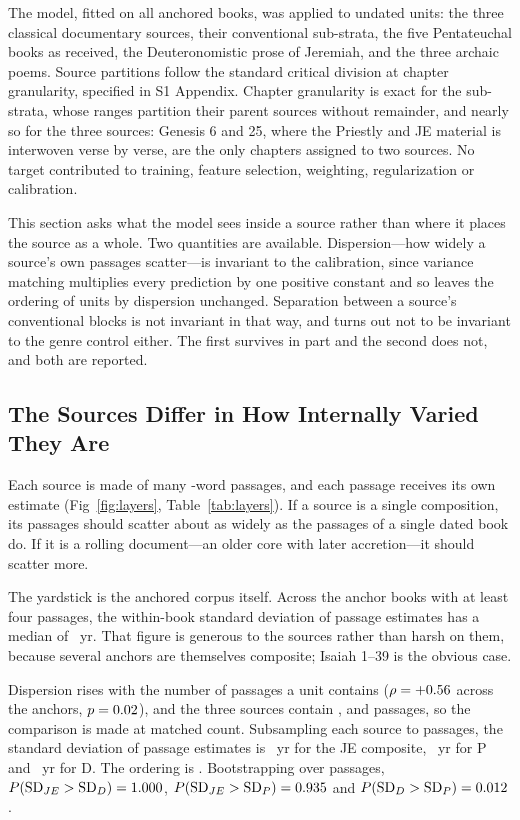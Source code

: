 \documentclass[10pt,letterpaper]{article}
\begin{document}
The model, fitted on all \HBbooks{} anchored books, was applied to
\NTargets{} undated units: the three classical documentary sources, their
conventional sub-strata, the five Pentateuchal books as received, the
Deuteronomistic prose of Jeremiah, and the three archaic poems.  Source
partitions follow the standard critical division at chapter granularity,
specified in S1 Appendix.  Chapter granularity is exact for the sub-strata,
whose ranges partition their parent sources without remainder, and nearly so for
the three sources: Genesis 6 and 25, where the Priestly and JE material is
interwoven verse by verse, are the only chapters assigned to two sources.  No
target contributed to training, feature selection, weighting, regularization or
calibration.

This section asks what the model sees inside a source rather than where it
places the source as a whole.  Two quantities are available.  Dispersion---how
widely a source's own passages scatter---is invariant to the calibration, since
variance matching multiplies every prediction by one positive constant and so
leaves the ordering of units by dispersion unchanged.  Separation between a
source's conventional blocks is not invariant in that way, and turns out not to
be invariant to the genre control either.  The first survives in part and the
second does not, and both are reported.

\subsection*{The Sources Differ in How Internally Varied They Are}

Each source is made of many \HBtarget-word passages, and each passage receives
its own estimate (Fig~\ref{fig:layers}, Table~\ref{tab:layers}).  If a source is a single composition, its passages should
scatter about as widely as the passages of a single dated book do.  If it is a
rolling document---an older core with later accretion---it should scatter more.

The yardstick is the anchored corpus itself.  Across the \LYrefN{} anchor books
with at least four passages, the within-book standard deviation of passage
estimates has a median of \LYrefMed~yr.  That figure is generous to the
sources rather than harsh on them, because several anchors are themselves
composite; Isaiah 1--39 is the obvious case.

Dispersion rises with the number of passages a unit contains ($\rho = +0.56$
across the anchors, $p = 0.02$), and the three sources contain \LYJEn, \LYDn{}
and \LYPn{} passages, so the comparison is made at matched count.  Subsampling
each source to \LYDn{} passages, the standard deviation of passage estimates is
\LYJEsd~yr for the JE composite, \LYPsd~yr for P and \LYDsd~yr for D.  The
ordering is \LYorder.  Bootstrapping over passages, $P(\mathrm{SD}_{JE} >
\mathrm{SD}_{D}) = 1.000$, $P(\mathrm{SD}_{JE} > \mathrm{SD}_{P}) =
0.935$ and $P(\mathrm{SD}_{D} > \mathrm{SD}_{P}) = 0.012$.
\end{document}

